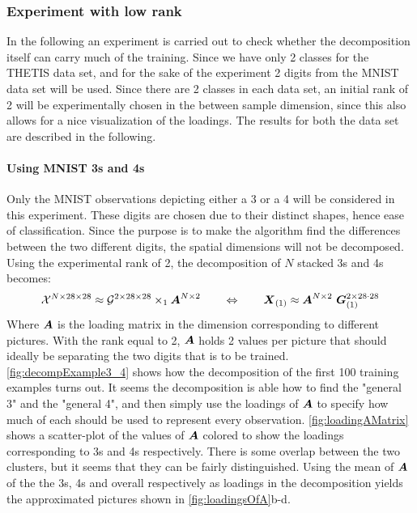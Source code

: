 \subsubsection{Experiment with low rank}
In the following an experiment is carried out to check whether the decomposition itself can carry much of the training. Since we have only 2 classes for the THETIS data set, and for the sake of the experiment 2 digits from the MNIST data set will be used. Since there are 2 classes in each data set, an initial rank of 2 will be experimentally chosen in the between sample dimension, since this also allows for a nice visualization of the loadings. The results for both the data set are described in the following.

\paragraph{Using MNIST 3s and 4s}
Only the MNIST observations depicting either a 3 or a 4 will be considered in this experiment. These digits are chosen due to their distinct shapes, hence ease of classification. Since the purpose is to make the algorithm find the differences between the two different digits, the spatial dimensions will not be decomposed. Using the experimental rank of 2, the decomposition of $N$ stacked 3s and 4s becomes:
\begin{equation}
    \tensor{X}^{N\times 28\times 28} \approx \tensor{G}^{2 \times 28 \times 28} \times_1 \bs{A}^{N\times 2} \qquad \Leftrightarrow \qquad \bs{X}_{(1)} \approx \bs{A}^{N\times 2} \ \bs{G}^{2 \times 28\cdot 28}_{(1)}
\end{equation}
Where $\boldsymbol{A}$ is the loading matrix in the dimension corresponding to different pictures. With the rank equal to 2, $\boldsymbol{A}$ holds 2 values per picture that should ideally be separating the two digits that is to be trained. \autoref{fig:decompExample3_4} shows how the decomposition of the first 100 training examples turns out. It seems the decomposition is able how to find the "general 3" and the "general 4", and then simply use the loadings of $\boldsymbol{A}$ to specify how much of each should be used to represent every observation. \autoref{fig:loadingAMatrix} shows a scatter-plot of the values of $\boldsymbol{A}$ colored to show the loadings corresponding to 3s and 4s respectively. There is some overlap between the two clusters, but it seems that they can be fairly distinguished. Using the mean of $\boldsymbol{A}$ of the the 3s, 4s and overall respectively as loadings in the decomposition yields the approximated pictures shown in \autoref{fig:loadingsOfA}b-d.

